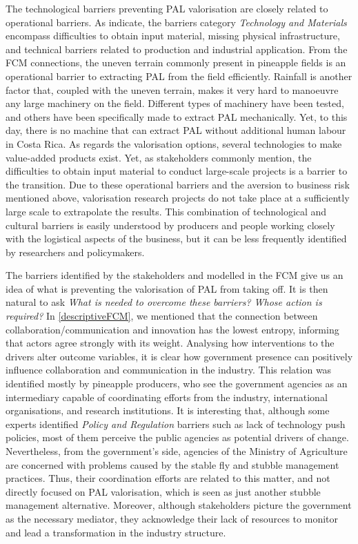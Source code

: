 The technological barriers preventing PAL valorisation are closely related to operational barriers. As \cite{gottinger2020studying} indicate, the barriers category \textit{Technology and Materials} encompass difficulties to obtain input material, missing physical infrastructure, and technical barriers related to production and industrial application. From the FCM connections, the uneven terrain commonly present in pineapple fields is an operational barrier to extracting PAL from the field efficiently. Rainfall is another factor that, coupled with the uneven terrain, makes it very hard to manoeuvre any large machinery on the field. Different types of machinery have been tested, and others have been specifically made to extract PAL mechanically. Yet, to this day, there is no machine that can extract PAL without additional human labour in Costa Rica. As regards the valorisation options, several technologies to make value-added products exist. Yet, as stakeholders commonly mention, the difficulties to obtain input material to conduct large-scale projects is a barrier to the transition. Due to these operational barriers and the aversion to business risk mentioned above, valorisation research projects do not take place at a sufficiently large scale to extrapolate the results. This combination of technological and cultural barriers is easily understood by producers and people working closely with the logistical aspects of the business, but it can be less frequently identified by researchers and policymakers. 

The barriers identified by the stakeholders and modelled in the FCM give us an idea of what is preventing the valorisation of PAL from taking off. It is then natural to ask \textit{What is needed to overcome these barriers? Whose action is required?} In \cref{descriptiveFCM}, we mentioned that the connection between collaboration/communication and innovation has the lowest entropy, informing that actors agree strongly with its weight. Analysing how interventions to the drivers alter outcome variables, it is clear how government presence can positively influence collaboration and communication in the industry. This relation was identified mostly by pineapple producers, who see the government agencies as an intermediary capable of coordinating efforts from the industry, international organisations, and research institutions. It is interesting that, although some experts identified \textit{Policy and Regulation} barriers such as lack of technology push policies, most of them perceive the public agencies as potential drivers of change. Nevertheless, from the government's side, agencies of the Ministry of Agriculture are concerned with problems caused by the stable fly and stubble management practices. Thus, their coordination efforts are related to this matter, and not directly focused on PAL valorisation, which is seen as just another stubble management alternative. Moreover, although stakeholders picture the government as the necessary mediator, they acknowledge their lack of resources to monitor and lead a transformation in the industry structure. 

